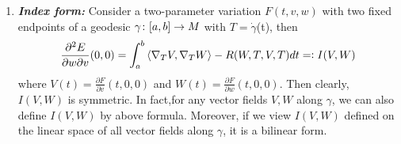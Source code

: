 \begin{enumerate}[label=\arabic{*}.]
\begin{proof}
\begin{itemize}
\begin{equation*}
				0 \neq \nabla_TU(0) = a^iX_i,\quad a^i \text{ not all }0
			\end{equation*}
			Then we have
			\begin{equation*}
				U(1) = (d\exp_p)_V(\nabla_TU(0)) = \sum_i a^i(d\exp_p)_V(X_i)
			\end{equation*}
			Because $a^i$ are not all $0$ and $(d\exp_p)_V(X_i)$ are independent, $U(1) \neq 0$. \qedhere
		\end{itemize}
	\end{proof}
	\begin{rmk}
		Consider a map $A_V \colon \mathcal{J}^\prime \rightarrow \ker (d \exp_p)_V$ defined by
		\begin{equation*}
			A_V(U) = \nabla_TU(0)
		\end{equation*}
		It is well-defined because $U(0) = 0$ implies that we can construct a radical variation $F$ with $U(t) = \frac{\partial F}{\partial s}(t,0)$ and $U(1) = (d\exp_p)_V(\nabla_TU(0)) = 0$. In $\Leftrightarrow$, we proved that $A_V$ is a surjection. And the injectivity is clear by the uniqueness of Jacobian field with same initial condition. So $A_V$ is an linear isomorphism. So the $\Rightarrow$ can be directly obtained by the map $A_V$. When $V$ is not a critical point, $\mathcal{J}^{\prime} = 0$ because $A_V$ is an isomorphism.
	\end{rmk}

	\item \emph{\textbf{Index form:}} Consider a two-parameter variation $F(t,v,w)$ with two fixed endpoints of a geodesic $\gamma \colon [a,b] \rightarrow M$ with $T = \dot{\gamma}$(t), then
	\begin{equation*}
		\frac{\partial^2 E}{\partial w \partial v}(0,0) = \int_a^b \left\langle \nabla_TV,\nabla_TW \right\rangle - R(W,T,V,T)dt =\vcentcolon I(V,W)
	\end{equation*}
	where $V(t) = \frac{\partial F}{\partial v}(t,0,0)$ and $W(t) = \frac{\partial F}{\partial w}(t,0,0)$. Then clearly, $I(V,W)$ is symmetric. In fact,for any vector fields $V,W$ along $\gamma$, we can also define $I(V,W)$ by above formula. Moreover, if we view $I(V,W)$ defined on the linear space of all vector fields along $\gamma$, it is a bilinear form.


\end{enumerate}
